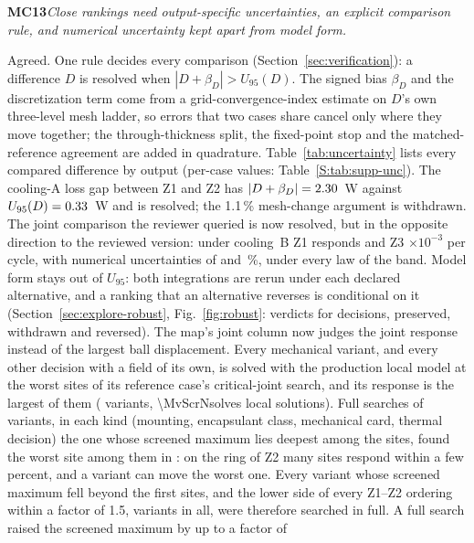 \documentclass[10pt]{article}
\newcommand{\grp}[1]{\num[group-separator={,},group-minimum-digits=4]{#1}}
\newcommand{\rc}[2]{\par\medskip\noindent\textbf{#1}\enspace\emph{#2}\par\smallskip\noindent}
\begin{document}
\rc{MC13}{Close rankings need output-specific uncertainties, an explicit comparison rule, and
numerical uncertainty kept apart from model form.}
Agreed. One rule decides every comparison (Section~\ref{sec:verification}): a difference $D$ is
resolved when $|D+\beta_D| > U_{95}(D)$. The signed bias $\beta_D$ and the discretization term come from
a grid-convergence-index estimate on $D$'s own three-level mesh ladder, so errors that two cases share
cancel only where they move together; the through-thickness split, the fixed-point stop and the
matched-reference agreement are added in quadrature. Table~\ref{tab:uncertainty} lists every compared
difference by output (per-case values: Table~\ref{S:tab:supp-unc}). The cooling-A loss gap between Z1
and Z2 has $|D+\beta_D| = 2.30$~W against $U_{95}(D) = 0.33$~W and
is resolved; the 1.1\,\% mesh-change argument is withdrawn. The joint comparison the reviewer queried
is now resolved, but in the opposite direction to the reviewed version: under cooling~B Z1 responds
\MvEpsBZone{} and Z3 \MvEpsBZthree$\times10^{-3}$ per cycle, with numerical uncertainties of
\MvEpsUrelBZone{} and \MvEpsUrelBZthree\,\%, under every law of the band. Model form stays out of
$U_{95}$: both integrations are rerun under each declared alternative, and a ranking that an
alternative reverses is conditional on it (Section~\ref{sec:explore-robust}, Fig.~\ref{fig:robust}:
\WrRobN{} verdicts for \WrRobCases{} decisions, \WrRobPreserved{} preserved, \WrRobWithdrawnWord{}
withdrawn and \WrRobReversedWord{} reversed). The map's joint
column now judges the joint response instead of the largest ball displacement. Every mechanical
variant, and every other decision with a field of its own, is solved with the production local model
at the \MvScrK{} worst sites of its reference case's critical-joint search, and its response is the
largest of them (\MvScrNvar{} variants, \grp{\MvScrNsolves} local solutions). Full searches of
\MvScrValNWord{} variants, in each kind (mounting, encapsulant class, mechanical card, thermal decision)
the one whose screened maximum lies deepest among the \MvScrK{} sites, found the worst site among
them in \MvScrValInTopKWord{}: on the ring of Z2 many sites respond within a few percent, and a variant
can move the worst one. Every variant whose screened maximum fell beyond the first \MvScrEscFracWord{}
sites, and the lower side of every Z1--Z2 ordering within a factor of 1.5, \MvScrEscN{} variants in
all, were therefore searched in full. A full search raised the screened maximum by up to a factor of
\end{document}
